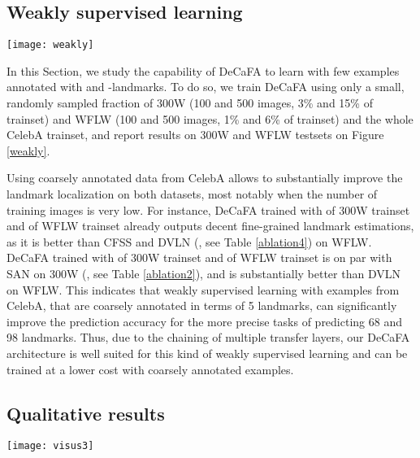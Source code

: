 \documentclass[10pt,twocolumn,letterpaper]{article}
\begin{document}
\subsection{Weakly supervised learning}\label{weeakly}

\begin{figure*}[ht]
	\centering
	\texttt{[image: weakly]}
	\caption{\% mean error comparison when training with small fraction of THE training set and coarsely annotated examples from CelebA.}
	\label{weakly}
\end{figure*}

In this Section, we study the capability of DeCaFA to learn with few examples annotated with  and -landmarks. To do so, we train DeCaFA using only a small, randomly sampled fraction of 300W (100 and 500 images, 3\% and 15\% of trainset) and WFLW (100 and 500 images,  1\% and 6\% of trainset) and the whole CelebA trainset, and report results on 300W and WFLW testsets on Figure \ref{weakly}.

Using coarsely annotated data from CelebA allows to substantially improve the landmark localization on both datasets, most notably when the number of training images is very low. For instance, DeCaFA trained with  of 300W trainset and  of WFLW trainset already outputs decent fine-grained landmark estimations, as it is better than CFSS \cite{zhu2015face} and DVLN (\cite{wu2017leveraging}, see Table \ref{ablation4}) on WFLW. DeCaFA trained with  of 300W trainset and  of WFLW trainset is on par with SAN on 300W (\cite{dong2018style}, see Table \ref{ablation2}), and is substantially better than DVLN on WFLW. This indicates that weakly supervised learning with examples from CelebA, that are coarsely annotated in terms of 5 landmarks, can significantly improve the prediction accuracy for the more precise tasks of predicting 68 and 98 landmarks. Thus, due to the chaining of multiple transfer layers, our DeCaFA architecture is well suited for this kind of weakly supervised learning and can be trained at a lower cost with coarsely annotated examples.

\subsection{Qualitative results}

\begin{figure*}[h!]
	\centering
	\texttt{[image: visus3]}
	\caption{From left to right: images, attention maps outputted by stages 1 and 4, alignment results, and ground truth for images from 300W (I-bug, 68 landmarks) and WFLW (98 landmarks). Notice how the summed attention maps are iteratively refined, and how closely the predicted landmarks usually matches the ground truth, even under difficult illumination, non-frontal head poses, make-up, or occlusions.}
	\label{heatmaps}
\end{figure*}
\end{document}
